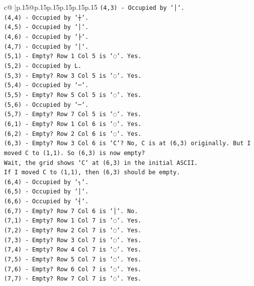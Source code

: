 \documentclass{article}
\begin{document}
{\begin{supertabular}{c@{$\;$}|p{.15\linewidth}@{}p{.15\linewidth}p{.15\linewidth}p{.15\linewidth}p{.15\linewidth}p{.15\linewidth}}
{{{\texttt{(4,3) {-} Occupied by `│`.} \\
\texttt{(4,4) {-} Occupied by `┼`.} \\
\texttt{(4,5) {-} Occupied by `│`.} \\
\texttt{(4,6) {-} Occupied by `├`.} \\
\texttt{(4,7) {-} Occupied by `│`.} \\
\texttt{(5,1) {-} Empty? Row 1 Col 5 is `◌`. Yes.} \\
\texttt{(5,2) {-} Occupied by L.} \\
\texttt{(5,3) {-} Empty? Row 3 Col 5 is `◌`. Yes.} \\
\texttt{(5,4) {-} Occupied by `─`.} \\
\texttt{(5,5) {-} Empty? Row 5 Col 5 is `◌`. Yes.} \\
\texttt{(5,6) {-} Occupied by `─`.} \\
\texttt{(5,7) {-} Empty? Row 7 Col 5 is `◌`. Yes.} \\
\texttt{(6,1) {-} Empty? Row 1 Col 6 is `◌`. Yes.} \\
\texttt{(6,2) {-} Empty? Row 2 Col 6 is `◌`. Yes.} \\
\texttt{(6,3) {-} Empty? Row 3 Col 6 is `C`? No, C is at (6,3) originally. But I moved C to (1,1). So (6,3) is now empty?} \\
\texttt{Wait, the grid shows `C` at (6,3) in the initial ASCII.} \\
\texttt{If I moved C to (1,1), then (6,3) should be empty.} \\
\texttt{(6,4) {-} Occupied by `┐`.} \\
\texttt{(6,5) {-} Occupied by `│`.} \\
\texttt{(6,6) {-} Occupied by `┤`.} \\
\texttt{(6,7) {-} Empty? Row 7 Col 6 is `│`. No.} \\
\texttt{(7,1) {-} Empty? Row 1 Col 7 is `◌`. Yes.} \\
\texttt{(7,2) {-} Empty? Row 2 Col 7 is `◌`. Yes.} \\
\texttt{(7,3) {-} Empty? Row 3 Col 7 is `◌`. Yes.} \\
\texttt{(7,4) {-} Empty? Row 4 Col 7 is `◌`. Yes.} \\
\texttt{(7,5) {-} Empty? Row 5 Col 7 is `◌`. Yes.} \\
\texttt{(7,6) {-} Empty? Row 6 Col 7 is `◌`. Yes.} \\
\texttt{(7,7) {-} Empty? Row 7 Col 7 is `◌`. Yes.} \\
\\ 
}}}
\end{supertabular}}
\end{document}
